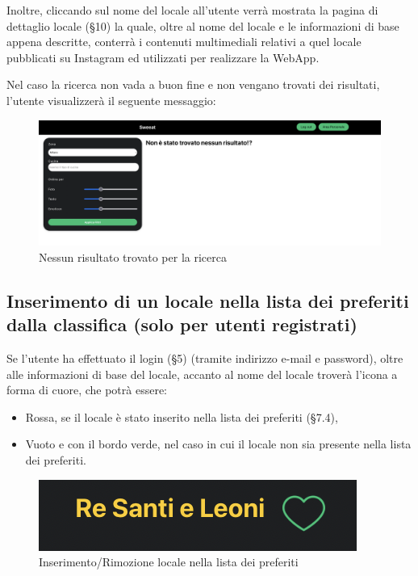 Inoltre, cliccando sul nome del locale all’utente verrà mostrata la pagina di dettaglio locale (\S{10}) la quale, oltre al nome del locale e le informazioni di base appena descritte, conterrà i contenuti multimediali relativi a quel locale pubblicati su Instagram ed utilizzati per realizzare la WebApp.

Nel caso la ricerca non vada a buon fine e non vengano trovati dei risultati, l’utente visualizzerà il seguente messaggio:

\begin{figure}[H]
\centering
\includegraphics[scale=0.3]{./images/Ricerca/ZeroRisultati.png} 
\caption{Nessun risultato trovato per la ricerca}
\end{figure}

\subsection{Inserimento di un locale nella lista dei preferiti dalla classifica (solo per utenti registrati)}

Se l’utente ha effettuato il login (\S{5}) (tramite indirizzo e-mail e password), oltre alle informazioni di base del locale, accanto al nome del locale troverà l’icona a forma di cuore, che potrà essere:

\begin{itemize}
\item Rossa, se il locale è stato inserito nella lista dei preferiti (\S{7.4}),
\item Vuoto e con il bordo verde, nel caso in cui il locale non sia presente nella lista dei preferiti.
\end{itemize}

\begin{figure}[H]
\centering
\includegraphics[scale=0.6]{./images/Ricerca/Cuore.png} 
\caption{Inserimento/Rimozione locale nella lista dei preferiti}
\end{figure}

